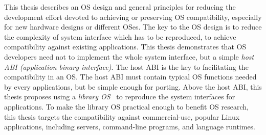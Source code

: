 This thesis describes an OS design and general principles for reducing the development effort devoted to achieving or preserving OS compatibility, especially for new hardware designs or different OSes.
The key to the OS design
is to reduce the complexity of system interface which has to be reproduced, to achieve compatibility against existing applications.
This thesis demonstrates that OS developers need not to implement
the whole system interface,
but a simple {\em host ABI (application binary interface)}.
The host ABI is the key to facilitating the compatibility in an OS.
The host ABI must
contain typical OS functions needed by every applications,
but be simple enough for porting.
Above the host ABI, this thesis proposes using a {\em library OS}~\cite{porter11drawbridge,engler95exokernel,libra,unikernels}
to reproduce the system interfaces for applications.
To make the library OS practical enough to benefit OS research,
this thesis targets the compatibility against commercial-use, popular Linux applications, including servers, command-line programs, and language runtimes.





